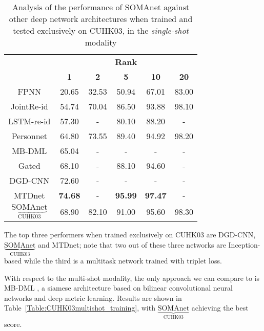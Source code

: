 \documentclass[10pt,journal,letterpaper,compsoc]{IEEEtran}
\newcommand{\ts}[2]{$\underbrace{\text{#1}}_\text{#2}$}
\begin{document}
\begin{table}[htbp]
\scriptsize
	\centering
\begin{minipage}[b]{0.9\columnwidth}
	\caption{Analysis of the performance of SOMAnet against other deep network architectures when trained and tested exclusively on CUHK03, in the \emph{single-shot} modality} \label{Table:CUHK03singleshot_training}
	\end{minipage}

	\begin{tabular}{cccccc}
		\toprule
		\multirow{ 2}{*}{\textbf{}} & \multicolumn{5}{c}{\textbf{Rank}} \\
		\cmidrule(r){2-6}
		 & \textbf{1} & \textbf{2}& \textbf{5} & \textbf{10} & \textbf{20} \\
		\midrule
    FPNN \cite{li2014deepreid}    & 20.65  & 32.53 & 50.94 & 67.01 & 83.00 \\
    JointRe-id \cite{Ahmed15}     & 54.74  & 70.04 & 86.50 & 93.88 & 98.10 \\
    LSTM-re-id \cite{LSTM_REID}   & 57.30  & -     & 80.10 & 88.20 & -     \\
    Personnet \cite{personnet}    & 64.80  & 73.55 & 89.40 & 94.92 & 98.20 \\
    MB-DML \cite{mbdml}           & 65.04  & -     & -     & -     & -     \\
    Gated \cite{GATED}            & 68.10  & -     & 88.10 & 94.60 & -     \\
    DGD-CNN \cite{Xiao_2016_CVPR} & 72.60 & -     & -     & -     & -     \\
    MTDnet \cite{chen2017multi} & \textbf{74.68}  & - & \textbf{95.99} & \textbf{97.47} & -     \\
    \ts{SOMAnet}{CUHK03} & 68.90 & 82.10  & 91.00  & 95.60 & 98.30 \\
    \bottomrule
    \end{tabular}
\end{table}

The top three performers when trained exclusively on CUHK03 are DGD-CNN, \ts{SOMAnet}{CUHK03} and MTDnet; note that two out of these three networks are Inception-based while the third is a multitask network trained with triplet loss.


With respect to the multi-shot modality, the only approach we can compare to is MB-DML \cite{mbdml,Lin_2015_ICCV}, a siamese architecture based on bilinear convolutional neural networks and deep metric learning. Results are shown in Table~\ref{Table:CUHK03multishot_training}, with \ts{SOMAnet}{CUHK03} achieving the best score.
\end{document}
